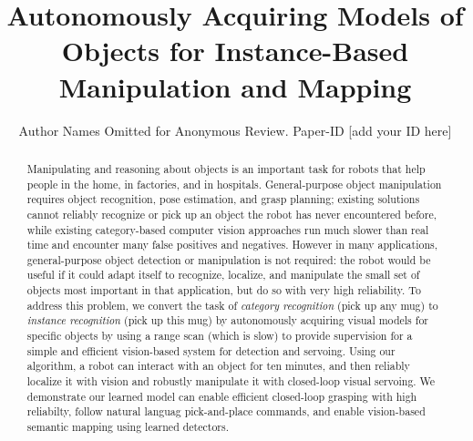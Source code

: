 \documentclass[conference]{IEEEtran}
\newcommand{\mytitle}[0]{Autonomously Acquiring Models of Objects for
  Instance-Based Manipulation and Mapping}
\begin{document}


\title{\mytitle{}}

\author{Author Names Omitted for Anonymous Review. Paper-ID [add your ID here]}

\maketitle



\begin{abstract}
Manipulating and reasoning about objects is an important task for
robots that help people in the home, in factories, and in hospitals.
General-purpose object manipulation requires object recognition, pose
estimation, and grasp planning; existing solutions cannot reliably
recognize or pick up an object the robot has never encountered before,
while existing category-based computer vision approaches run much
slower than real time and encounter many false positives and
negatives.  However in many applications, general-purpose object
detection or manipulation is not required: the robot would be useful
if it could adapt itself to recognize, localize, and manipulate the
small set of objects most important in that application, but do so
with very high reliability.  To address this problem, we convert the
task of {\em category recognition} (pick up any mug) to {\em instance
  recognition} (pick up this mug) by autonomously acquiring visual
models for specific objects by using a range scan (which is slow) to
provide supervision for a simple and efficient vision-based system for
detection and servoing.  Using our algorithm, a robot can interact
with an object for ten minutes, and then reliably localize it with
vision and robustly manipulate it with closed-loop visual servoing.
We demonstrate our learned model can enable efficient closed-loop
grasping with high reliabilty, follow natural languag pick-and-place
commands, and enable vision-based semantic mapping using learned
detectors.


\end{abstract}
\end{document}

